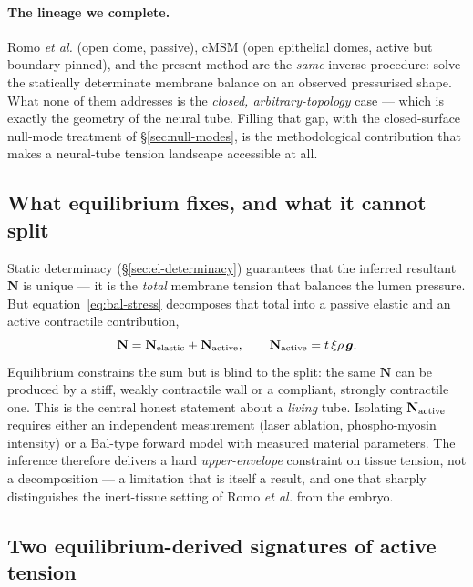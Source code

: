\documentclass[11pt]{article}
\newcommand{\vv}[1]{\bm{#1}}          %
\newcommand{\Nb}{\mathbf{N}}           %
\begin{document}
\paragraph{The lineage we complete.}  Romo \textit{et al.} (open dome, passive),
cMSM (open epithelial domes, active but boundary-pinned), and the present method
are the \emph{same} inverse procedure: solve the statically determinate membrane
balance on an observed pressurised shape.  What none of them addresses is the
\emph{closed, arbitrary-topology} case --- which is exactly the geometry of the
neural tube.  Filling that gap, with the closed-surface null-mode treatment of
\S\ref{sec:null-modes}, is the methodological contribution that makes a
neural-tube tension landscape accessible at all.

\subsection{What equilibrium fixes, and what it cannot split}
\label{sec:nt-decomposition}

Static determinacy (\S\ref{sec:el-determinacy}) guarantees that the inferred
resultant $\Nb$ is unique --- it is the \emph{total} membrane tension that
balances the lumen pressure.  But equation~\eqref{eq:bal-stress} decomposes that
total into a passive elastic and an active contractile contribution,
\begin{equation}
  \Nb = \Nb_{\rm elastic} + \Nb_{\rm active},
  \qquad
  \Nb_{\rm active} = t\,\xi\rho\,\vv g .
  \label{eq:nt-split}
\end{equation}
Equilibrium constrains the sum but is blind to the split: the same $\Nb$ can be
produced by a stiff, weakly contractile wall or a compliant, strongly
contractile one.  This is the central honest statement about a \emph{living}
tube.  Isolating $\Nb_{\rm active}$ requires either an independent measurement
(laser ablation, phospho-myosin intensity) or a Bal-type forward model with
measured material parameters.  The inference therefore delivers a hard
\emph{upper-envelope} constraint on tissue tension, not a decomposition --- a
limitation that is itself a result, and one that sharply distinguishes the
inert-tissue setting of Romo \textit{et al.} from the embryo.

\subsection{Two equilibrium-derived signatures of active tension}
\label{sec:nt-signatures}
\end{document}

